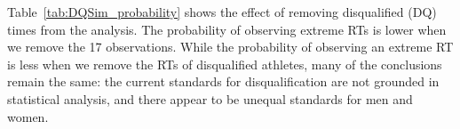\documentclass[12pt, letterpaper]{article}
\begin{document}
Table~\ref{tab:DQSim_probability} shows the effect of removing disqualified (DQ)
times from the analysis.  The probability of observing extreme RTs is lower when
we remove the 17 observations.  While the probability of observing an extreme
RT is less when we remove the RTs of disqualified athletes, many of the 
conclusions remain the same: the current standards for disqualification are not
grounded in statistical analysis, and there appear to be unequal standards for men
and women.



\end{document}

